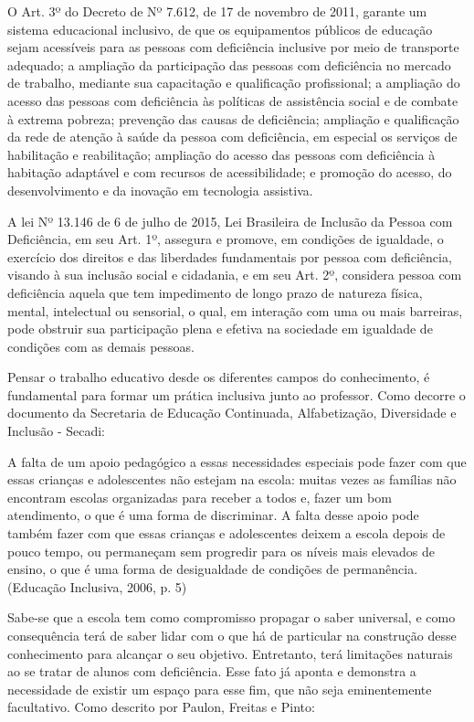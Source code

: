 \documentclass[brasil]{abnt}
\begin{document}
	O Art. 3º do Decreto de Nº 7.612, de 17 de novembro de 2011, garante um sistema educacional inclusivo, de que os equipamentos públicos de educação sejam acessíveis para as pessoas com deficiência 
	inclusive por meio de transporte adequado; a ampliação da participação das pessoas com deficiência no mercado de trabalho, mediante sua capacitação e qualificação profissional; a 
	ampliação do acesso das pessoas com deficiência às políticas de assistência social e de combate à extrema pobreza; prevenção das causas de deficiência; ampliação e qualificação da rede de atenção à saúde 
	da pessoa com deficiência, em especial os serviços de habilitação e reabilitação; ampliação do acesso das pessoas com deficiência à habitação adaptável e com recursos de acessibilidade; e promoção do acesso, 
	do desenvolvimento e da inovação em tecnologia assistiva. 
						
	A lei Nº 13.146 de 6 de julho de 2015, Lei Brasileira de Inclusão da Pessoa com Deficiência, em seu Art. 1º, assegura e promove, em condições de igualdade, o exercício dos direitos 
	e das liberdades fundamentais por pessoa com deficiência, visando à sua inclusão social e cidadania, e em seu Art. 2º, considera pessoa com deficiência aquela que tem impedimento de longo prazo de natureza 
	física, mental, intelectual ou sensorial, o qual, em interação com uma ou mais barreiras, pode obstruir sua participação plena e efetiva na sociedade em igualdade de condições com as demais pessoas. 
	
	Pensar o trabalho educativo desde os diferentes campos do conhecimento, é fundamental para formar um prática inclusiva junto ao professor. Como decorre o documento da Secretaria de Educação Continuada, 
	Alfabetização, Diversidade e Inclusão - Secadi:
	
		\begin{citacao} A falta de um apoio pedagógico a essas necessidades especiais pode fazer com que essas crianças e adolescentes não estejam na escola: muitas vezes as famílias não encontram escolas 
						organizadas para receber a todos e, fazer um bom atendimento, o que é uma forma de discriminar. A falta desse apoio pode também fazer com que essas crianças e adolescentes deixem a 
						escola depois de pouco tempo, ou permaneçam sem progredir para os níveis mais elevados de ensino, o que é uma forma de desigualdade de condições de permanência. 
						(Educação Inclusiva, 2006, p. 5)
		\end{citacao}

	Sabe-se que a escola tem como compromisso propagar o saber universal, e como consequência terá de saber lidar com o que há de particular na construção desse conhecimento para alcançar o seu objetivo. 
	Entretanto, terá limitações naturais ao se tratar de alunos com deficiência. Esse fato já aponta e demonstra a necessidade de existir um espaço para esse fim, que não seja eminentemente facultativo.
	Como descrito por Paulon, Freitas e Pinto:
		
\end{document}
